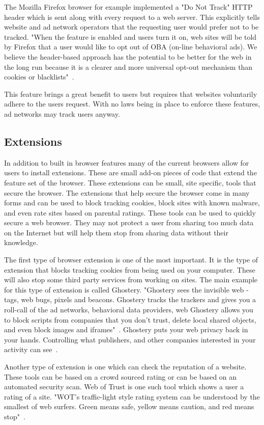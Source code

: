 The Mozilla Firefox browser for example implemented a "Do Not Track" HTTP header
which is sent along with every request to a web server. This explicitly tells
website and ad network operators that the requesting user would prefer not to be
tracked. "When the feature is enabled and users turn it on, web sites will be
told by Firefox that a user would like to opt out of OBA (on-line behavioral
ads). We believe the header-based approach has the potential to be better for
the web in the long run because it is a clearer and more universal opt-out
mechanism than cookies or blacklists"~\cite{fpc}.

This feature brings a great benefit to users but requires that websites voluntarily
adhere to the users request. With no laws being in place to enforce these
features, ad networks may track users anyway.

\subsection{Extensions} 
In addition to built in browser features many of the current browsers allow for
users to install extensions. These are small add-on pieces of code that extend
the feature set of the browser. These extensions can be small, site specific,
tools that secure the browser. The extensions that help secure
the browser come in many forms and can be used to block tracking cookies, block
sites with known malware, and even rate sites based on parental ratings. These
tools can be used to quickly secure a web browser. They may not protect a user
from sharing too much data on the Internet but will help them stop from sharing data
without their knowledge.

The first type of browser extension is one of the most important. It is the type
of extension that blocks tracking cookies from being used on your computer.
These will also stop some third party services from working on sites. The main
example for this type of extension is called Ghostery. "Ghostery sees the
invisible web - tags, web bugs, pixels and beacons. Ghostery tracks the trackers
and gives you a roll-call of the ad networks, behavioral data providers, web
Ghostery allows you to block scripts from companies that you don't trust, delete
local shared objects, and even block images and iframes"~\cite{ghost}. Ghostery puts your web
privacy back in your hands. Controlling what publishers, and other companies interested in your
activity can see~\cite{ghost}.

Another type of extension is one which can check the reputation of a website.
These tools can be based on a crowd sourced rating or can be based on an
automated security scan. Web of Trust is one such tool which shows a user a
rating of a site. "WOT’s traffic-light style rating system can be understood by
the smallest of web surfers. Green means safe, yellow means caution, and red
means stop"~\cite{wot}.

